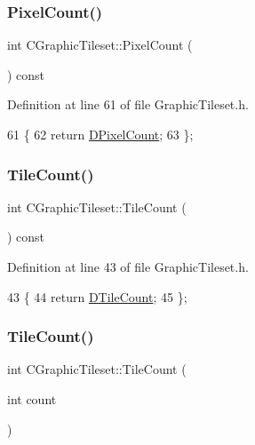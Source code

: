\subsubsection{\texorpdfstring{Pixel\+Count()}{PixelCount()}}
{\footnotesize\ttfamily int C\+Graphic\+Tileset\+::\+Pixel\+Count (\begin{DoxyParamCaption}{ }\end{DoxyParamCaption}) const\hspace{0.3cm}{\ttfamily [inline]}}



Definition at line 61 of file Graphic\+Tileset.\+h.


\begin{DoxyCode}
61                               \{
62             \textcolor{keywordflow}{return} \hyperlink{classCGraphicTileset_a55fc9ceb1c92383c124e61c911fe57db}{DPixelCount};
63         \};
\end{DoxyCode}
\hypertarget{classCGraphicTileset_a0d2f8ba4131b180243df3819cde783c3}{}\label{classCGraphicTileset_a0d2f8ba4131b180243df3819cde783c3} 
\subsubsection{\texorpdfstring{Tile\+Count()}{TileCount()}\hspace{0.1cm}{\footnotesize\ttfamily [1/2]}}
{\footnotesize\ttfamily int C\+Graphic\+Tileset\+::\+Tile\+Count (\begin{DoxyParamCaption}{ }\end{DoxyParamCaption}) const\hspace{0.3cm}{\ttfamily [inline]}}



Definition at line 43 of file Graphic\+Tileset.\+h.


\begin{DoxyCode}
43                              \{
44             \textcolor{keywordflow}{return} \hyperlink{classCGraphicTileset_a39d942b370e47f441bf97385eb1037c8}{DTileCount};
45         \};
\end{DoxyCode}
\hypertarget{classCGraphicTileset_a98f779275d9009a01e042d7a240ae995}{}\label{classCGraphicTileset_a98f779275d9009a01e042d7a240ae995} 
\subsubsection{\texorpdfstring{Tile\+Count()}{TileCount()}\hspace{0.1cm}{\footnotesize\ttfamily [2/2]}}
{\footnotesize\ttfamily int C\+Graphic\+Tileset\+::\+Tile\+Count (\begin{DoxyParamCaption}\item[{int}]{count }\end{DoxyParamCaption})}



